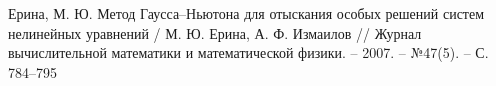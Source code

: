 \renewcommand\refname{Список использованной литературы}
\makeatletter
\renewcommand\@biblabel[1]{#1.}
\makeatother
\begin{thebibliography}{2}

     Ерина, М. Ю. Метод Гаусса–Ньютона для отыскания особых решений систем нелинейных уравнений / М. Ю. Ерина, А. Ф. Измаилов // Журнал вычислительной математики и математической физики. -- 2007. -- №47(5). -- С. 784--795

\end{thebibliography}